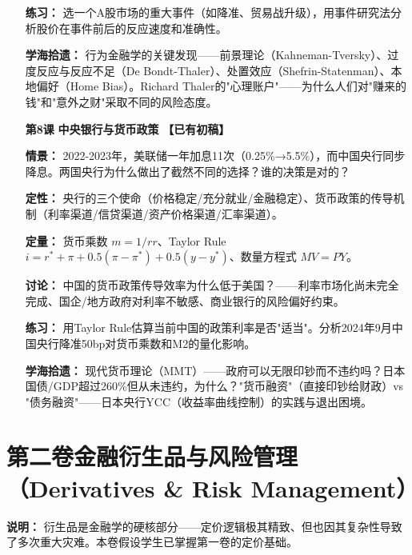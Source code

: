 \documentclass[a4paper,11pt]{ctexart}
\newcommand{\done}{\textcolor{green!50!black}{\textbf{【已有初稿】}}}
\begin{document}
\begin{enumerate}
\textbf{练习：} 选一个A股市场的重大事件（如降准、贸易战升级），用事件研究法分析股价在事件前后的反应速度和准确性。

\textbf{学海拾遗：} 行为金融学的关键发现——前景理论（Kahneman-Tversky）、过度反应与反应不足（De Bondt-Thaler）、处置效应（Shefrin-Statenman）、本地偏好（Home Bias）。Richard Thaler的"心理账户"——为什么人们对"赚来的钱"和"意外之财"采取不同的风险态度。

\item[\textbf{第8课}] \textbf{中央银行与货币政策} \done

\textbf{情景：} 2022-2023年，美联储一年加息11次（0.25\%→5.5\%），而中国央行同步降息。两国央行为什么做出了截然不同的选择？谁的决策是对的？

\textbf{定性：} 央行的三个使命（价格稳定/充分就业/金融稳定）、货币政策的传导机制（利率渠道/信贷渠道/资产价格渠道/汇率渠道）。

\textbf{定量：} 货币乘数 $m = 1/rr$、Taylor Rule $i = r^* + \pi + 0.5(\pi - \pi^*) + 0.5(y - y^*)$、数量方程式 $MV = PY$。

\textbf{讨论：} 中国的货币政策传导效率为什么低于美国？——利率市场化尚未完全完成、国企/地方政府对利率不敏感、商业银行的风险偏好约束。

\textbf{练习：} 用Taylor Rule估算当前中国的政策利率是否"适当"。分析2024年9月中国央行降准50bp对货币乘数和M2的量化影响。

\textbf{学海拾遗：} 现代货币理论（MMT）——政府可以无限印钞而不违约吗？日本国债/GDP超过260\%但从未违约，为什么？"货币融资"（直接印钞给财政）vs "债务融资"——日本央行YCC（收益率曲线控制）的实践与退出困境。

\end{enumerate}

\newpage

\section*{\textcolor{blue!70!black}{第二卷\quad 金融衍生品与风险管理（Derivatives \& Risk Management）}}

\textbf{说明：} 衍生品是金融学的硬核部分——定价逻辑极其精致、但也因其复杂性导致了多次重大灾难。本卷假设学生已掌握第一卷的定价基础。
\end{document}
